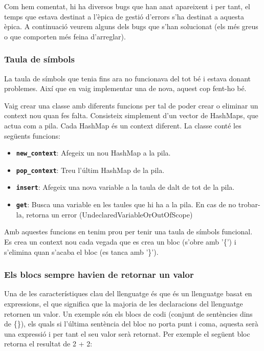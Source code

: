 ﻿\documentclass{article}
\begin{document}
Com hem comentat, hi ha diversos bugs que han anat apareixent i per tant, el
temps que estava destinat a l'èpica de gestió d'errors s'ha destinat a aquesta
èpica. A continuació veurem alguns dels bugs que s'han solucionat (els més
greus o que comporten més feina d'arreglar).

\subsubsection{Taula de símbols}

La taula de símbols que tenia fins ara no funcionava del tot bé i estava donant
problemes. Així que en vaig implementar una de nova, aquest cop fent-ho bé.

Vaig crear una classe amb diferents funcions per tal de poder crear o eliminar
un context nou quan fes falta. Consisteix simplement d'un vector de HashMaps,
que actua com a pila. Cada HashMap és un context diferent. La classe conté les
següents funcions:

\begin{itemize}
    \item \texttt{\textbf{new\_context}}: Afegeix un nou HashMap a la pila.
    \item \texttt{\textbf{pop\_context}}: Treu l'últim HashMap de la pila.
    \item \texttt{\textbf{insert}}: Afegeix una nova variable a la taula de dalt
    de tot de la pila.
    \item \texttt{\textbf{get}}: Busca una variable en les taules que hi ha a la
    pila. En cas de no trobar-la, retorna un error (UndeclaredVariableOrOutOfScope)
\end{itemize}

Amb aquestes funcions en tenim prou per tenir una taula de símbols funcional. Es
crea un context nou cada vegada que es crea un bloc (s'obre amb '\{') i
s'elimina quan s'acaba el bloc (es tanca amb '\}').

\subsubsection{Els blocs sempre havien de retornar un valor}

Una de les característiques clau del llenguatge és que és un llenguatge basat en
expressions, el que significa que la majoria de les declaracions del llenguatge
retornen un valor. Un exemple són els blocs de codi (conjunt de sentències dins
de \{\}), els quals si l'última sentència del bloc no porta punt i coma, aquesta
serà una expressió i per tant el seu valor serà retornat. Per exemple el següent
bloc retorna el resultat de 2 + 2:
\end{document}

